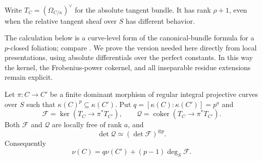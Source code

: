 Write $T_C=(\Omega_{C/\kappa})^\vee$ for the absolute tangent bundle.
It has rank $\rho+1$, even when the relative tangent sheaf over $S$ has
different behavior.

The calculation below is a curve-level form of the canonical-bundle
formula for a $p$-closed foliation; compare
\cite[Section~I.1, Proposition~1.1 and Equations~(1.2)--(1.3)]{Ekedahl1988}.
We prove the version needed here directly from local presentations,
using absolute differentials over the perfect constants. In this way
the kernel, the Frobenius-power cokernel, and all inseparable residue
extensions remain explicit.

\begin{lemma}
\label{lem:height-one}
Let $\pi:C\to C'$ be a finite dominant morphism of regular integral
projective curves over $S$ such that
$\kappa(C)^p\subseteq\kappa(C')$.  Put
$q=[\kappa(C):\kappa(C')]=p^a$ and
\[
 \mathcal F=\ker(T_C\longrightarrow\pi^*T_{C'}),
 \qquad
 \mathcal Q=\operatorname{coker}(T_C\longrightarrow\pi^*T_{C'}).
\]
Both $\mathcal F$ and $\mathcal Q$ are locally free of rank $a$, and
\begin{equation}
 \det\mathcal Q\simeq(\det\mathcal F)^{\otimes p}.
 \label{eq:height-one-cokernel}
\end{equation}
Consequently
\begin{equation}
 \nu(C)=q\nu(C')+(p-1)\deg_S\mathcal F.
 \label{eq:height-one-genus}
\end{equation}
\end{lemma}

